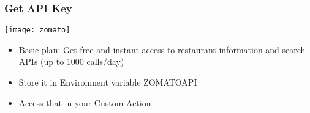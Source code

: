  \begin{frame}[fragile]\frametitle{Get API Key}
 
 \begin{center}
\texttt{[image: zomato]}
\end{center}

\begin{itemize}
\item Basic plan:  Get free and instant access to restaurant information and search APIs (up to 1000 calls/day)
\item Store it in Environment variable ZOMATOAPI
\item Access that in your Custom Action 
\end{itemize}



\end{frame}